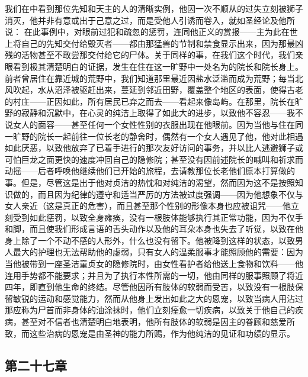 我们在中看到那位先知和天主的人的清晰实例，他因一次不顺从的过失立刻被狮子消灭，他并非有意或出于己意之过，而是受他人引诱而卷入，就如圣经论及他所说： 在此事例中，对眼前过犯和疏忽的惩罚，连同他正义的赏报——主为此在世上将自己的先知交付给毁灭者——都由那猛兽的节制和禁食显示出来，因为那最凶残的活物甚至不敢尝那交付给它的尸体。关于同样的事，在我们这个时代，我们亲眼看到极其清楚明白的证据，发生在住在这一旷野中一处名为的院长和院长身上。前者曾居住在靠近城的荒野中，我们知道那里最近因盐水泛滥而成为荒野；每当北风吹起，水从沼泽被驱赶出来，蔓延到邻近田野，覆盖整个地区的表面，使得古老的村庄——正因如此，所有居民已弃之而去——看起来像岛屿。在那里，院长在旷野的寂静和沉默中，在心灵的纯洁上取得了如此大的进步，以致他不容忍——我不说女人的面容——甚至任何一个女性性别的衣服出现在他眼前。因为当他与住在同一旷野的院长一起前往一位长老的静舍时，偶然有一个女人遇见了他，他对此相遇如此厌恶，以致他放弃了已着手进行的那次友好访问的事务，并以比人逃避狮子或可怕巨龙之面更快的速度冲回自己的隐修院；甚至没有因前述院长的喊叫和祈求而动摇——后者呼唤他继续他们已开始的旅程，去请教那位长老他们原本打算做的事。但是，尽管这是出于他对贞洁的热忱和对纯洁的渴望，然而因为这不是按照知识做的，而且因为纪律的遵守和适当严厉的方法被过度强调——因为他想象不仅与女人亲近（这是真正的危害），而且甚至那个性别的形像本身也应被诅咒——他立刻受到如此惩罚，以致全身瘫痪，没有一根肢体能够执行其正常功能，因为不仅手和脚，而且使我们形成言语的舌头动作以及他的耳朵本身也失去了听觉，以致在他身上除了一个不动不感的人形外，什么也没有留下。他被降到这样的状态，以致男人最大的护理也无法帮助他的虚弱，只有女人的温柔服事才能照顾他的需要：因为当他被带到一座圣洁童贞女的隐修院时，由女性看护者给他送上食物和饮料——他连用手势都不能要求；并且为了执行本性所需的一切，他由同样的服事照顾了将近四年，即直到他生命的终结。尽管他因所有肢体的软弱而受苦，以致没有一根肢保留敏锐的运动和感觉能力，然而从他身上发出如此之大的恩宠，以致当病人用沾过那应称为尸首而非身体的油涂抹时，他们立刻痊愈一切疾病，以致关于他自己的疾病，甚至对不信者也清楚明白地表明，他所有肢体的软弱是因主的眷顾和慈爱所致，而这些治病的恩宠是由圣神的能力所赐，作为他纯洁的见证和功绩的显示。\par


\subsection{第二十七章}

